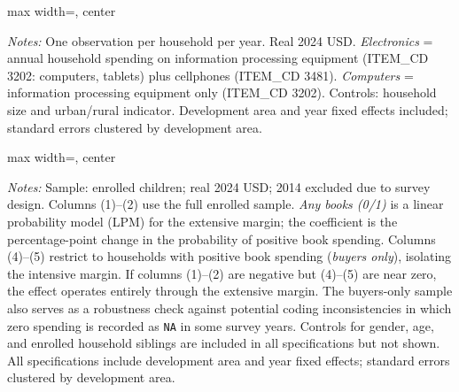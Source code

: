 \documentclass[12pt]{article}
\newcommand*{\TableLagOnePath}{../Paper_3_Tables/Lagged_1Year_Tables}
\begin{document}
	\begin{table}[H]
	\centering
	\begin{adjustbox}{max width=\linewidth, center}
	\begin{threeparttable}
		\caption{Household Electronics Spending (Computers + Cellphones), IV Estimates}
		\label{tab:electronics_expenditure}
		{\small}
		\begin{tablenotes}
			\small
			\item \textit{Notes:} One observation per household per year. Real 2024 USD. \textit{Electronics} = annual household spending on information processing equipment (ITEM\_CD 3202: computers, tablets) plus cellphones (ITEM\_CD 3481). \textit{Computers} = information processing equipment only (ITEM\_CD 3202). Controls: household size and urban/rural indicator. Development area and year fixed effects included; standard errors clustered by development area.
		\end{tablenotes}
	\end{threeparttable}
	\end{adjustbox}
	\end{table}

	\begin{table}[H]
	\centering
	\begin{adjustbox}{max width=\linewidth, center}
	\begin{threeparttable}
		\caption{Book Spending: Intensive vs.\ Extensive Margin, IV Estimates}
		\label{tab:books_margin}
		{\small}
		\begin{tablenotes}
			\small
			\item \textit{Notes:} Sample: enrolled children; real 2024 USD; 2014 excluded due to survey design. Columns (1)--(2) use the full enrolled sample. \textit{Any books (0/1)} is a linear probability model (LPM) for the extensive margin; the coefficient is the percentage-point change in the probability of positive book spending. Columns (4)--(5) restrict to households with positive book spending (\textit{buyers only}), isolating the intensive margin. If columns (1)--(2) are negative but (4)--(5) are near zero, the effect operates entirely through the extensive margin. The buyers-only sample also serves as a robustness check against potential coding inconsistencies in which zero spending is recorded as \texttt{NA} in some survey years. Controls for gender, age, and enrolled household siblings are included in all specifications but not shown. All specifications include development area and year fixed effects; standard errors clustered by development area.
		\end{tablenotes}
	\end{threeparttable}
	\end{adjustbox}
	\end{table}
\end{document}
